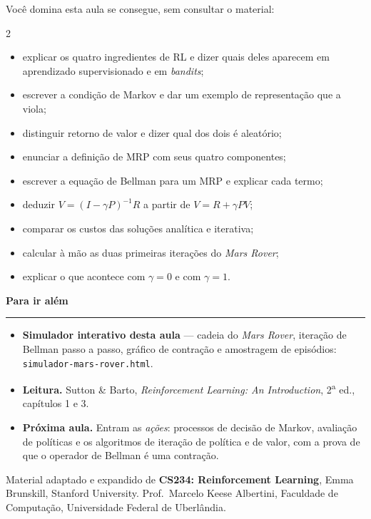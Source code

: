 \documentclass[10pt, a4paper]{article}
\newcounter{secao}
\newcommand{\secao}[1]{%
  \stepcounter{secao}%
  \vspace{0.7em}%
  \noindent{\color{rlLaranja}\rule{1.6em}{2pt}}\hspace{0.5em}%
  {\color{rlCinza}\footnotesize\bfseries\thesecao}\hspace{0.35em}%
  {\color{rlAzul}\large\bfseries #1}%
  \par\vspace{-0.15em}%
  {\color{rlAzul!22}\rule{\linewidth}{0.6pt}}%
  \par\vspace{0.25em}}
\newcommand{\rec}{R}
\begin{document}
Você domina esta aula se consegue, sem consultar o material:

\begin{multicols}{2}
{\footnotesize
\begin{itemize}[leftmargin=1.5em, itemsep=0.3ex, topsep=0.2ex, label=$\square$]
  \item explicar os quatro ingredientes de RL e dizer quais deles aparecem em
        aprendizado supervisionado e em \emph{bandits};
  \item escrever a condição de Markov e dar um exemplo de representação que a
        viola;
  \item distinguir retorno de valor e dizer qual dos dois é aleatório;
  \item enunciar a definição de MRP com seus quatro componentes;
  \item escrever a equação de Bellman para um MRP e explicar cada termo;
  \item deduzir $V = (I - \gamma P)^{-1}\rec$ a partir de
        $V = \rec + \gamma P V$;
  \item comparar os custos das soluções analítica e iterativa;
  \item calcular à mão as duas primeiras iterações do \emph{Mars Rover};
  \item explicar o que acontece com $\gamma = 0$ e com $\gamma = 1$.
\end{itemize}}
\end{multicols}

\secao{Para ir além}

\begin{itemize}[leftmargin=1.2em, itemsep=0.2ex, topsep=0.2ex]
  \item \textbf{Simulador interativo desta aula} — cadeia do \emph{Mars Rover},
        iteração de Bellman passo a passo, gráfico de contração e amostragem de
        episódios: \texttt{simulador-mars-rover.html}.
  \item \textbf{Leitura.} Sutton \& Barto, \emph{Reinforcement Learning: An
        Introduction}, 2\textsuperscript{a} ed., capítulos 1 e 3.
  \item \textbf{Próxima aula.} Entram as \emph{ações}: processos de decisão de
        Markov, avaliação de políticas e os algoritmos de iteração de política
        e de valor, com a prova de que o operador de Bellman é uma contração.
\end{itemize}

\vfill
{\footnotesize\color{rlCinza}
Material adaptado e expandido de \textbf{CS234: Reinforcement Learning},
Emma Brunskill, Stanford University. Prof.\ Marcelo Keese Albertini,
Faculdade de Computação, Universidade Federal de Uberlândia.}

\label{ultimapagina}
\end{document}
